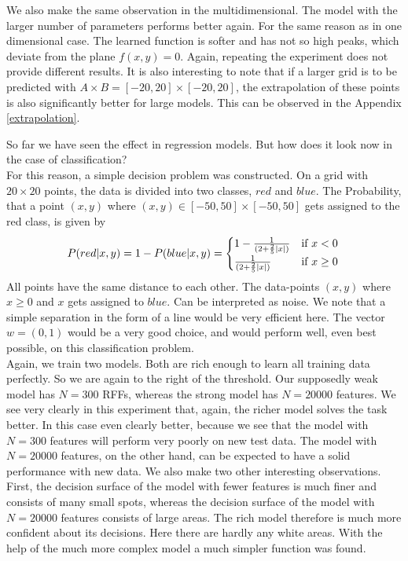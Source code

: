 We also make the same observation in the multidimensional. The model with the larger number of parameters performs better again. For the same reason as in one dimensional case. The learned function is softer and has not so high peaks, which deviate from the plane $f(x,y) = 0$. Again, repeating the experiment does not provide different results. It is also interesting to note that if a larger grid is to be predicted with $A\times B = [-20,20]\times [-20,20]$, the extrapolation of these points is also significantly better for large models. This can be observed in the Appendix \ref{extrapolation}.

So far we have seen the effect in regression models. But how does it look now in the case of classification? \\
For this reason, a simple decision problem was constructed. On a grid with $20 \times 20$ points, the data is divided into two classes, $red$ and $blue$. The Probability, that a point $(x,y)$ where $(x,y) \in [-50,50] \times [-50,50]$ gets assigned to the red class, is given by
$$
P(red| x,y) = 1 - P(blue| x,y) = \begin{cases}
1 - \frac{1}{(2+ \frac{2}{5}|x|)} & \text{if } x < 0\\
\frac{1}{(2+ \frac{2}{5}|x|)} & \text{if } x \geq 0 \\
\end{cases}\\
$$
All points have the same distance to each other. The data-points $(x,y)$ where $x \geq 0$ and $x$ gets assigned to $blue$. Can be interpreted as noise. We note that a simple separation in the form of a line would be very efficient here. The vector $w = (0,1)$ would be a very good choice, and would perform well, even best possible, on this classification problem. \\
Again, we train two models. Both are rich enough to learn all training data perfectly. So we are again to the right of the threshold. Our supposedly weak model has $N = 300$ RFFs, whereas the strong model has $N = 20000$ features.
We see very clearly in this experiment that, again, the richer model solves the task better. In this case even clearly better, because we see that the model with $N = 300$ features will perform very poorly on new test data. 
The model with $N = 20000$ features, on the other hand, can be expected to have a solid performance with new data. We also make two other interesting observations. First, the decision surface of the model with fewer features is much finer and consists of many small spots, whereas the decision surface of the model with $N = 20000$ features consists of large areas. The rich model therefore is much more confident about its decisions. Here there are hardly any white areas. With the help of the much more complex model a much simpler function was found. \\

